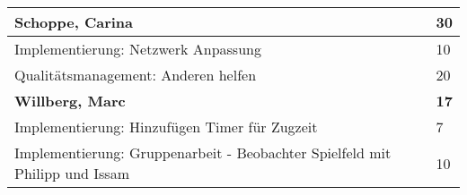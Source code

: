 \documentclass[a4paper,11pt]{scrartcl}
\begin{document}
\begin{longtable}{| p{13.8cm} | C{2.4cm} |}
	\hline
	\hline


	\textbf{Schoppe, Carina} & \textbf{30}\\ %
	\hline

  Implementierung: Netzwerk Anpassung
	&
  10
	\\
	\hline

  Qualitätsmanagement: Anderen helfen
	&
  20
	\\
	\hline
	\hline


	\textbf{Willberg, Marc} & \textbf{17}\\ %
	\hline

  Implementierung: Hinzufügen Timer für Zugzeit
	&
  7
	\\
	\hline

  Implementierung: Gruppenarbeit - Beobachter Spielfeld mit Philipp und Issam
	&
  10
	\\
	\hline

\end{longtable}
\end{document}
